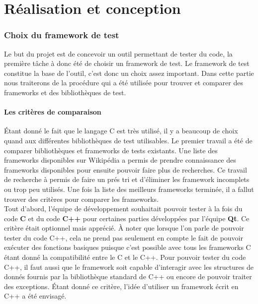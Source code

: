 \documentclass[a4paper]{article}
\begin{document}
\part{Réalisation et conception}

\section{Choix du framework de test}%

Le but du projet est de concevoir un outil permettant de tester du code, la
première tâche à donc été de choisir un framework de test. Le framework de test
constitue la base de l'outil, c'est donc un choix assez important. Dans cette
partie nous traiterons de la procédure qui a été utilisée pour trouver et
comparer des frameworks et des bibliothèques de test.

\subsection{Les critères de comparaison}%

Étant donné le fait que le langage C est très utilisé, il y a beaucoup de choix
quand aux différentes bibliothèques de test utilisables. Le premier travail a
été de comparer bibliothèques et frameworks de tests existants. Une liste des
frameworks disponibles sur Wikipédia \cite{enwikiframeworks} a permis de prendre
connaissance des frameworks disponibles pour ensuite pouvoir faire plus de
recherches. Ce travail de recherche à permis de faire un prés tri et d'éliminer
les framework incomplets ou trop peu utilisés. Une fois la liste des meilleurs
frameworks terminée, il a fallut trouver des critères pour comparer les
frameworks. \\

Tout d'abord, l'équipe de développement souhaitait pouvoir tester à la fois du
code \textbf{C} et du code \textbf{C++} pour certaines parties développées par
l'équipe \textbf{Qt}. Ce critère était optionnel mais apprécié. À noter que
lorsque l'on parle de pouvoir tester du code C++, cela ne prend pas seulement en
compte le fait de pouvoir exécuter des fonctions basiques puisque c'est possible
avec tous les frameworks C étant donné la compatibilité entre le C et le C++.
Pour pouvoir tester du code C++, il faut aussi que le framework soit capable
d'interagir avec les structures de donnés fournis par la bibliothèque standard
de C++ ou encore de pouvoir traiter des exceptions. Étant donné ce critère,
l'idée d'utiliser un framework écrit en C++ a été envisagé.
\end{document}
